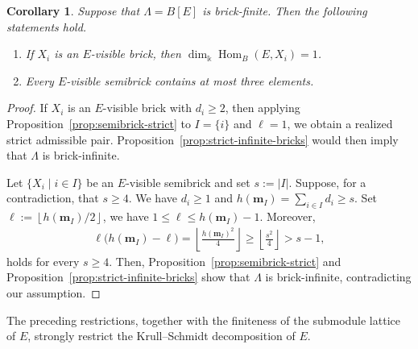 \documentclass[a4,12pt]{amsart}
\numberwithin{equation}{section} %
\def\Hom{\operatorname{Hom}} %
\newtheorem{corollary}[theorem]{Corollary} %
\theoremstyle{definition} %
\begin{document}
\begin{corollary}\label{cor:visible-obstructions}
Suppose that $\Lambda=B[E]$ is brick-finite. Then the following statements hold.
\begin{enumerate}
\item If $X_i$ is an $E$-visible brick, then $\dim_{\Bbbk}\Hom_B(E,X_i)=1$. 

\item Every $E$-visible semibrick contains at most three elements.
\end{enumerate}
\end{corollary}
\begin{proof}
If $X_i$ is an $E$-visible brick with $d_i\geq2$, then applying Proposition~\ref{prop:semibrick-strict} to $I=\{i\}$ and $\ell=1$, we obtain a realized strict admissible pair. Proposition~\ref{prop:strict-infinite-bricks} would then imply that $\Lambda$ is brick-infinite.

Let $\{X_i\mid i\in I\}$ be an $E$-visible semibrick and set $s:=|I|$. Suppose, for a contradiction, that $s\geq4$. We have $d_i\geq1$ and $h(\mathbf{m}_I)=\sum_{i\in I}d_i\geq s$. Set $\ell:=\left\lfloor h(\mathbf{m}_I)/2\right\rfloor$, we have $1\leq\ell\leq h(\mathbf{m}_I)-1$. Moreover,
\[
\begin{aligned}
\ell\bigl(h(\mathbf{m}_I)-\ell\bigr)=
\left\lfloor\frac{h(\mathbf{m}_I)^2}{4}\right\rfloor\geq
\left\lfloor\frac{s^2}{4}\right\rfloor
>
s-1,
\end{aligned}
\]
holds for every $s\geq4$. Then, Proposition~\ref{prop:semibrick-strict} and Proposition~\ref{prop:strict-infinite-bricks} show that $\Lambda$ is brick-infinite, contradicting our assumption.
\end{proof}

The preceding restrictions, together with the finiteness of the submodule lattice of $E$, strongly restrict the Krull--Schmidt decomposition of $E$.
\end{document}
